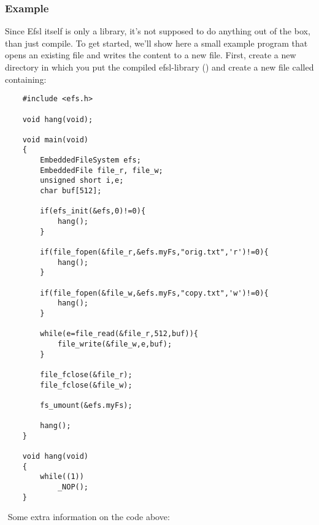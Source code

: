 \subsubsection{Example}
Since Efsl itself is only a library, it's not supposed to do anything out of
the box, than just compile. To get started, we'll show here a small example
program that opens an existing file and writes the content to a new file.
\newline\newline
First, create a new directory in which you put the compiled efsl-library
() and create a new file called  containing:
\lstset{numbers=left, stepnumber=1, numberstyle=\small, numbersep=5pt, tabsize=4}
\begin{lstlisting}
	#include <efs.h>

	void hang(void);

	void main(void)
	{
		EmbeddedFileSystem efs;
		EmbeddedFile file_r, file_w;
		unsigned short i,e;
		char buf[512];

		if(efs_init(&efs,0)!=0){
			hang();
		}

		if(file_fopen(&file_r,&efs.myFs,"orig.txt",'r')!=0){
			hang();
		}

		if(file_fopen(&file_w,&efs.myFs,"copy.txt",'w')!=0){
			hang();
		}

		while(e=file_read(&file_r,512,buf)){
			file_write(&file_w,e,buf);
		}

		file_fclose(&file_r);
		file_fclose(&file_w);

		fs_umount(&efs.myFs);

		hang();
	}

	void hang(void)
	{
		while((1))
			_NOP();
	}
\end{lstlisting}
$ $\newline
Some extra information on the code above:
